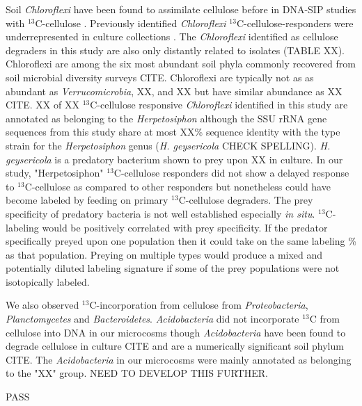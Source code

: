 Soil \textit{Chloroflexi} have been found to assimilate cellulose before in
DNA-SIP studies with $^{13}$C-cellulose \citep{Schellenberger_2010}. Previously
identified \textit{Chloroflexi} $^{13}$C-cellulose-responders were
underrepresented in culture collections \citep{Schellenberger_2010}.
The \textit{Chloroflexi} identified
as cellulose degraders in this study are also only distantly related to
isolates (TABLE XX).
Chloroflexi are among the six most abundant soil phyla commonly recovered from
soil microbial diversity surveys CITE. Chloroflexi are typically not as as
abundant as \textit{Verrucomicrobia}, XX, and XX but have similar abundance as
XX CITE. XX of XX $^{13}$C-cellulose responsive \textit{Chloroflexi} identified
in this study are annotated as belonging to the \textit{Herpetosiphon} although
the SSU rRNA gene sequences from this study share at most XX\% sequence
identity with the type strain for the \textit{Herpetosiphon} genus (\textit{H.
geysericola} CHECK SPELLING). \textit{H. geysericola} is a predatory bacterium
shown to prey upon XX in culture. In our study, "Herpetosiphon"
$^{13}$C-cellulose responders did not show a delayed response to
$^{13}$C-cellulose as compared to other responders but nonetheless could have
become labeled by feeding on primary $^{13}$C-cellulose degraders. The prey
specificity of predatory bacteria is not well established especially \textit{in
situ}. $^{13}$C-labeling would be positively correlated with prey
specificity. If the predator specifically preyed upon one population then it
could take on the same labeling \% as that population. Preying on multiple
types would produce a mixed and potentially diluted labeling signature if some
of the prey populations were not isotopically labeled. 

We also observed $^{13}$C-incorporation from cellulose from \textit{Proteobacteria}, \textit{Planctomycetes} and \textit{Bacteroidetes}. 
\textit{Acidobacteria} did not incorporate $^{13}$C from cellulose into DNA in
our microcosms though \textit{Acidobacteria} have been found to degrade
cellulose in culture CITE and are a numerically significant soil phylum CITE.
The \textit{Acidobacteria} in our microcosms were mainly annotated as belonging
to the "XX" group. NEED TO DEVELOP THIS FURTHER.

PASS

